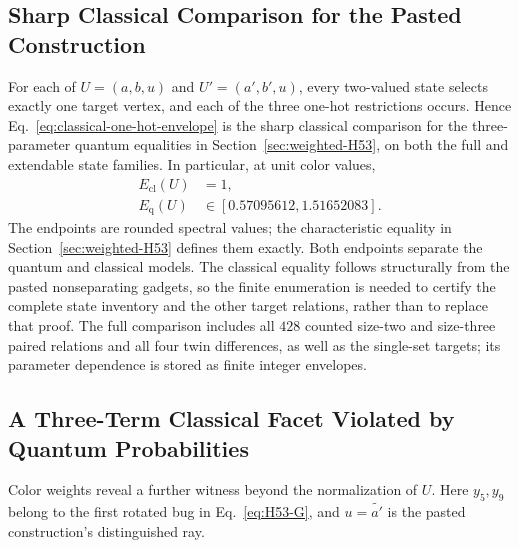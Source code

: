 \documentclass[aps,pra,reprint,superscriptaddress,longbibliography,nofootinbib,floatfix,10pt]{revtex4-2}
\theoremstyle{definition}\newtheorem{definition}[theorem]{Definition}
\theoremstyle{remark}\newtheorem{remark}[theorem]{Remark}
\begin{document}
\subsection{Sharp Classical Comparison for the Pasted Construction}\label{sec:classical-H53}

For each of $U=(a,b,u)$ and $U'=(a',b',u)$, every two-valued state selects exactly one target vertex, and each of the three one-hot restrictions occurs. Hence Eq.~\eqref{eq:classical-one-hot-envelope} is the sharp classical comparison for the three-parameter quantum equalities in Section~\ref{sec:weighted-H53}, on both the full and extendable state families. In particular, at unit color values,
\begin{equation}\label{eq:H53-classical-quantum-interval}
\begin{aligned}
E_{\mathrm{cl}}(U)&=1,\\
E_{\mathrm{q}}(U)&\in[0.57095612,1.51652083].
\end{aligned}
\end{equation}
The endpoints are rounded spectral values; the characteristic equality in Section~\ref{sec:weighted-H53} defines them exactly. Both endpoints separate the quantum and classical models. The classical equality follows structurally from the pasted nonseparating gadgets, so the finite enumeration is needed to certify the complete state inventory and the other target relations, rather than to replace that proof. The full comparison includes all $428$ counted size-two and size-three paired relations and all four twin differences, as well as the single-set targets; its parameter dependence is stored as finite integer envelopes.

\subsection{A Three-Term Classical Facet Violated by Quantum Probabilities}\label{sec:H53-weighted-facet}

Color weights reveal a further witness beyond the normalization of $U$. Here $y_5,y_9$ belong to the first rotated bug in Eq.~\eqref{eq:H53-G}, and $u=\widetilde{a'}$ is the pasted construction's distinguished ray.
\end{document}
